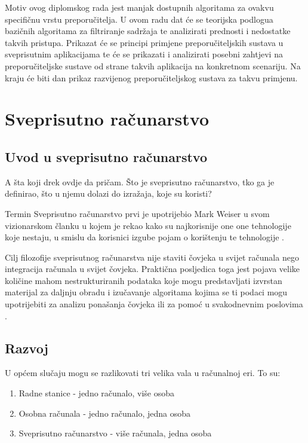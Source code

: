 \documentclass[times, utf8, diplomski, numeric]{fer}
\begin{document}
Motiv ovog diplomskog rada jest manjak dostupnih algoritama za ovakvu
specifičnu vrstu preporučitelja. U ovom radu dat će se teorijska
podlogua bazičnih algoritama za filtriranje sadržaja te analizirati prednosti i
nedostatke takvih pristupa. Prikazat će se principi primjene preporučiteljskih
sustava u sveprisutnim aplikacijama te će se prikazati i analizirati posebni
zahtjevi na preporučiteljske sustave od strane takvih aplikacija na konkretnom
scenariju. Na kraju će biti dan prikaz razvijenog preporučiteljskog sustava za
takvu primjenu.

\chapter{Sveprisutno računarstvo}
\section{Uvod u sveprisutno računarstvo}
A šta koji drek ovdje da pričam. Što je sveprisutno računarstvo, tko ga je
definirao, što u njemu dolazi do izražaja, koje su koristi?

Termin \glqq Sveprisutno računarstvo \grqq prvi je upotrijebio Mark Weiser u
svom vizionarskom članku u kojem je rekao kako su najkorisnije
one one tehnologije koje nestaju, u smislu da korisnici izgube pojam o
korištenju te tehnologije \cite{computer21}. 

Cilj filozofije sveprisutnog računarstva nije staviti čovjeka u svijet računala
nego integracija računala u svijet čovjeka. Praktična posljedica toga jest
pojava velike količine mahom nestrukturiranih podataka koje mogu predstavljati
izvrstan materijal za daljnju obradu i izučavanje algoritama kojima se ti podaci
mogu upotrijebiti za analizu ponašanja čovjeka ili za pomoć u svakodnevnim
poslovima \cite{VukoticTankovic}.



\section{Razvoj}
U općem slučaju mogu se razlikovati tri velika vala u računalnoj eri. To su:
\begin{enumerate}
  \item Radne stanice  - jedno računalo, više osoba
  \item Osobna računala  - jedno računalo, jedna
  osoba
  \item Sveprisutno računarstvo  - više računala,
  jedna osoba
\end{enumerate}
\end{document}
